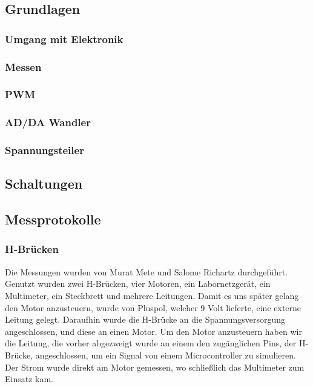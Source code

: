 \documentclass{report}
\begin{document}
\subsection{Grundlagen}

\subsubsection{Umgang mit Elektronik}

\subsubsection{Messen}

\subsubsection{PWM}

\subsubsection{AD/DA Wandler}

\subsubsection{Spannungsteiler}

\subsection{Schaltungen}

\subsection{Messprotokolle}

\subsubsection{H-Br\"{u}cken}
Die Messungen wurden von Murat Mete und Salome Richartz durchgef\"{u}hrt. Genutzt wurden zwei H-Br\"{u}cken, vier Motoren, ein Labornetzger\"{a}t, ein Multimeter, ein Steckbrett und mehrere Leitungen. Damit es uns sp\"{a}ter gelang den Motor anzusteuern, wurde von Pluspol, welcher 9 Volt lieferte, eine externe Leitung gelegt. Daraufhin wurde die H-Br\"{u}cke an die Spannungsversorgung angeschlossen, und diese an einen Motor. Um den Motor anzusteuern haben wir die Leitung, die vorher abgezweigt wurde an einem den zug\"{a}nglichen Pins, der H-Br\"{u}cke, angeschlossen, um ein Signal von einem Microcontroller zu simulieren. Der Strom wurde direkt am Motor gemessen, wo schlie{\ss}lich das Multimeter zum Einsatz kam.
\end{document}

